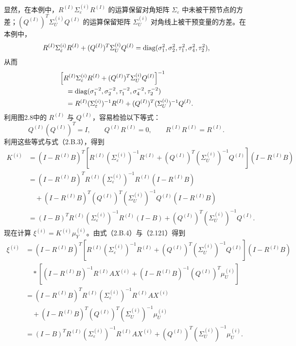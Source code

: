 显然，在本例中，$R^{(I)}\Sigma_\varepsilon^{(i)}R^{(I)}$ 的运算保留对角矩阵 $\Sigma_\varepsilon$ 中未被干预节点的方差；$(Q^{(I)})^T\Sigma_U^{(i)}Q^{(I)}$ 的运算保留矩阵 $\Sigma_U^{(i)}$ 对角线上被干预变量的方差。在本例中，
\[
R^{(I)}\Sigma_\varepsilon^{(i)}R^{(I)}
 +(Q^{(I)})^T\Sigma_U^{(i)}Q^{(I)}
 =\operatorname{diag}(\sigma_1^2,\sigma_2^2,\tau_1^2,\sigma_4^2,\tau_2^2),
\]
从而
\[
\begin{aligned}
&\left[R^{(I)}\Sigma_\varepsilon^{(i)}R^{(I)}
 +(Q^{(I)})^T\Sigma_U^{(i)}Q^{(I)}\right]^{-1}\\
&\quad=\operatorname{diag}(\sigma_1^{-2},\sigma_2^{-2},\tau_1^{-2},
            \sigma_4^{-2},\tau_2^{-2})\\
&\quad=R^{(I)}(\Sigma_\varepsilon^{(i)})^{-1}R^{(I)}
 +(Q^{(I)})^T(\Sigma_U^{(i)})^{-1}Q^{(I)}.
\end{aligned}
\]
利用图2.8中的 $R^{(I)}$ 与 $Q^{(I)}$，容易检验以下等式：
\[
Q^{(I)}(Q^{(I)})^T=I,\qquad Q^{(I)}R^{(I)}=0,\qquad
R^{(I)}R^{(I)}=R^{(I)}.
\]
利用这些等式与式（2.B.3），得到
\begin{equation}
\begin{aligned}
K^{(i)}
 &=(I-R^{(I)}B)^T
 \left[R^{(I)}(\Sigma_\varepsilon^{(i)})^{-1}R^{(I)}
 +(Q^{(I)})^T(\Sigma_U^{(i)})^{-1}Q^{(I)}\right](I-R^{(I)}B)\\
 &=(I-R^{(I)}B)^TR^{(I)}(\Sigma_\varepsilon^{(i)})^{-1}
    R^{(I)}(I-R^{(I)}B)\\
 &\quad+(I-R^{(I)}B)^T(Q^{(I)})^T
       (\Sigma_U^{(i)})^{-1}Q^{(I)}(I-R^{(I)}B)\\
 &=(I-B)^TR^{(I)}(\Sigma_\varepsilon^{(i)})^{-1}R^{(I)}(I-B)
 +(Q^{(I)})^T(\Sigma_U^{(i)})^{-1}Q^{(I)}.
\end{aligned}\tag{2.B.4}
\end{equation}
现在计算 $\xi^{(i)}=K^{(i)}\mu_Y^{(i)}$。由式（2.B.4）与（2.121）得到
\begin{equation}
\begin{aligned}
\xi^{(i)}
 &=(I-R^{(I)}B)^T
 \left[R^{(I)}(\Sigma_\varepsilon^{(i)})^{-1}R^{(I)}
 +(Q^{(I)})^T(\Sigma_U^{(i)})^{-1}Q^{(I)}\right](I-R^{(I)}B)\\
 &\quad{}\ast
 \left[(I-R^{(I)}B)^{-1}R^{(I)}AX^{(i)}
 +(I-R^{(I)}B)^{-1}(Q^{(I)})^T\mu_U^{(i)}\right]\\
 &=(I-R^{(I)}B)^TR^{(I)}(\Sigma_\varepsilon^{(i)})^{-1}
    R^{(I)}AX^{(i)}\\
 &\quad+(I-R^{(I)}B)^T(Q^{(I)})^T
    (\Sigma_U^{(i)})^{-1}\mu_U^{(i)}\\
 &=(I-B)^TR^{(I)}(\Sigma_\varepsilon^{(i)})^{-1}R^{(I)}AX^{(i)}
 +(Q^{(I)})^T(\Sigma_U^{(i)})^{-1}\mu_U^{(i)}.
\end{aligned}\tag{2.B.5}
\end{equation}
